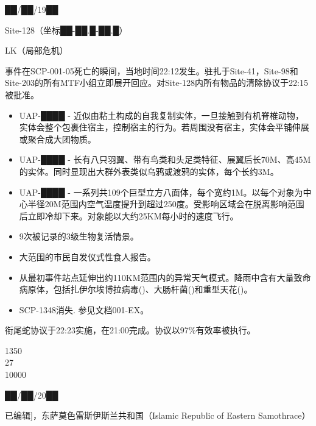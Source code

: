 


██\slash ██\slash 19██

Site-128（坐标██-██.█-██.█）

LK（局部危机）

事件在SCP-001-05死亡的瞬间，当地时间22:12发生。驻扎于Site-41，Site-98和Site-203的所有MTF小组立即展开回应。对Site-128内所有物品的清除协议于22:15被批准。


\begin{itemize}
\item UAP-████ - 近似由粘土构成的自我复制实体，一旦接触到有机脊椎动物，实体会整个包裹住宿主，控制宿主的行为。若周围没有宿主，实体会平铺伸展或聚合成大团物质。
\item UAP-████ - 长有八只羽翼、带有鸟类和头足类特征、展翼后长70M、高45M的实体。同时显现出大群外表类似乌鸦或渡鸦的实体，每个长约3M。
\item UAP-████ - 一系列共109个巨型立方八面体，每个宽约1M。以每个对象为中心半径20M范围内空气温度提升到超过250度。受影响区域会在脱离影响范围后立即冷却下来。对象能以大约25KM每小时的速度飞行。
\item 9次被记录的3级生物复活情景。
\item 大范围的市民自发仪式性食人报告。
\item 从最初事件站点延伸出约110KM范围内的异常天气模式。降雨中含有大量致命病原体，包括扎伊尔埃博拉病毒()、大肠杆菌()和重型天花()。
\item SCP-1348消失. 参见文档001-EX。
\end{itemize}

衔尾蛇协议于22:23实施，在21:00完成。协议以97\%有效率被执行。

1350\\
27\\
10000




██\slash ██\slash 20██

\bb{地点：}{[}已编辑]，东萨莫色雷斯伊斯兰共和国（Islamic Republic of Eastern Samothrace）


